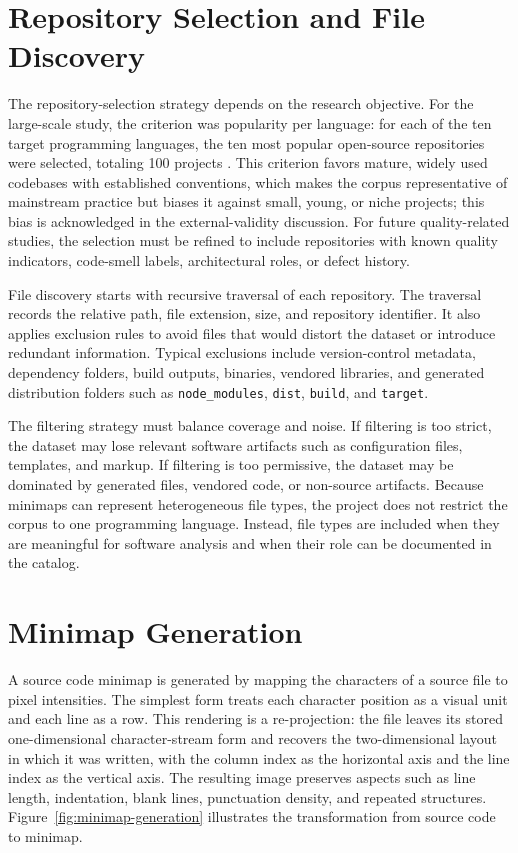 \section{Repository Selection and File Discovery}

The repository-selection strategy depends on the research objective. For the
large-scale study, the criterion was popularity per language: for each of the
ten target programming languages, the ten most popular open-source repositories
were selected, totaling 100 projects \cite{gebara2025ciarp}. This criterion
favors mature, widely used codebases with established conventions, which makes
the corpus representative of mainstream practice but biases it against small,
young, or niche projects; this bias is acknowledged in the external-validity
discussion. For future quality-related studies, the selection must be refined
to include repositories with known quality indicators, code-smell labels,
architectural roles, or defect history.

File discovery starts with recursive traversal of each repository. The traversal
records the relative path, file extension, size, and repository identifier. It
also applies exclusion rules to avoid files that would distort the dataset or
introduce redundant information. Typical exclusions include version-control
metadata, dependency folders, build outputs, binaries, vendored libraries, and
generated distribution folders such as \texttt{node\_modules}, \texttt{dist},
\texttt{build}, and \texttt{target}.

The filtering strategy must balance coverage and noise. If filtering is too
strict, the dataset may lose relevant software artifacts such as configuration
files, templates, and markup. If filtering is too permissive, the dataset may be
dominated by generated files, vendored code, or non-source artifacts. Because
minimaps can represent heterogeneous file types, the project does not restrict
the corpus to one programming language. Instead, file types are included when
they are meaningful for software analysis and when their role can be documented
in the catalog.

\section{Minimap Generation}

A source code minimap is generated by mapping the characters of a source file to
pixel intensities. The simplest form treats each character position as a visual
unit and each line as a row. This rendering is a re-projection:
the file leaves its stored one-dimensional character-stream form and recovers
the two-dimensional layout in which it was written, with the column index as
the horizontal axis and the line index as the vertical axis. The resulting
image preserves aspects such as line length, indentation, blank lines,
punctuation density, and repeated structures.
Figure~\ref{fig:minimap-generation} illustrates the transformation from source
code to minimap.

